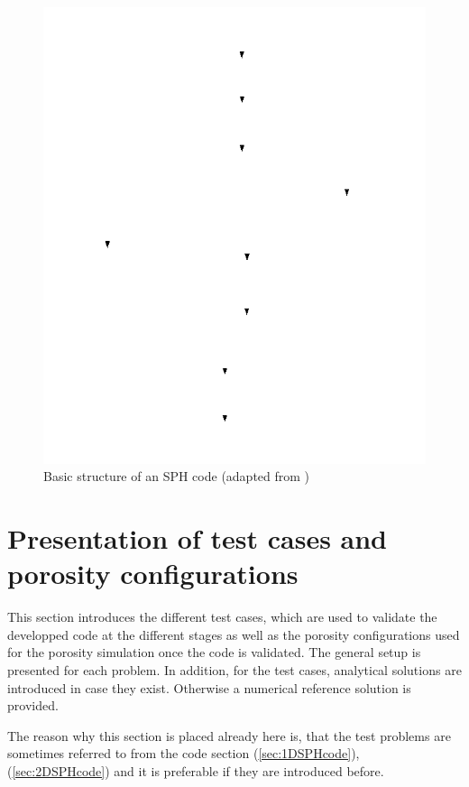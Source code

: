 \documentclass{report}
\begin{document}
\begin{figure}[!htbp]
  \centering
     \includegraphics[width=1.0\textwidth]{Graphics/general_structure_SPH}
  \caption{Basic structure of an SPH code (adapted from \cite{Liu2003}) }
  \label{fig:BasicSphCode}
\end{figure}

\section{Presentation of test cases and porosity configurations}
\label{sec:GenIntroTestCases}
 
This section introduces the different test cases, which are used to validate the developped code at the different stages as well as the porosity configurations used for the porosity simulation once the code is validated. The general setup is presented for each problem. In addition, for the test cases,  analytical solutions are introduced in case they exist. Otherwise a numerical reference solution is provided.

The reason why this section is placed already here is, that the test problems are sometimes referred to from the code section (\ref{sec:1DSPHcode}),(\ref{sec:2DSPHcode}) and it is preferable if they are introduced before.
\end{document}
